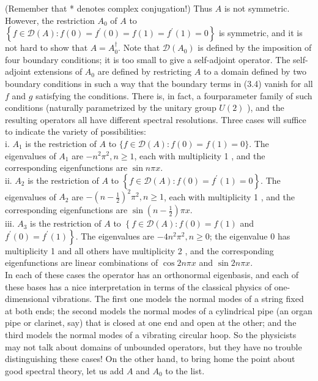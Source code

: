 \documentclass[10pt, letterpaper]{article}
\begin{document}
(Remember that * denotes complex conjugation!) Thus $A$ is not symmetric. However, the restriction $A_{0}$ of $A$ to $\left\{f \in \mathcal{D}(A): f(0)=f^{\prime}(0)=f(1)=f^{\prime}(1)=0\right\}$ is symmetric, and it is not hard to show that $A=A_{0}^{\dagger}$. Note that $\mathcal{D}\left(A_{0}\right)$ is defined by the imposition of four boundary conditions; it is too small to give a self-adjoint operator. The self-adjoint extensions of $A_{0}$ are defined by restricting $A$ to a domain defined by two boundary conditions in such a way that the boundary terms in (3.4) vanish for all $f$ and $g$ satisfying the conditions. There is, in fact, a fourparameter family of such conditions (naturally parametrized by the unitary group $U(2)$ ), and the resulting operators all have different spectral resolutions. Three cases will suffice to indicate the variety of possibilities:\\
i. $A_{1}$ is the restriction of $A$ to $\{f \in \mathcal{D}(A): f(0)=f(1)=0\}$. The eigenvalues of $A_{1}$ are $-n^{2} \pi^{2}, n \geq 1$, each with multiplicity 1 , and the corresponding eigenfunctions are $\sin n \pi x$.\\
ii. $A_{2}$ is the restriction of $A$ to $\left\{f \in \mathcal{D}(A): f(0)=f^{\prime}(1)=0\right\}$. The eigenvalues of $A_{2}$ are $-\left(n-\frac{1}{2}\right)^{2} \pi^{2}, n \geq 1$, each with multiplicity 1 , and the corresponding eigenfunctions are $\sin \left(n-\frac{1}{2}\right) \pi x$.\\
iii. $A_{3}$ is the restriction of $A$ to $\left\{f \in \mathcal{D}(A): f(0)=f(1)\right.$ and $\left.f^{\prime}(0)=f^{\prime}(1)\right\}$. The eigenvalues are $-4 n^{2} \pi^{2}, n \geq 0$; the eigenvalue 0 has multiplicity 1 and all others have multiplicity 2 , and the corresponding eigenfunctions are linear combinations of $\cos 2 n \pi x$ and $\sin 2 n \pi x$.\\
In each of these cases the operator has an orthonormal eigenbasis, and each of these bases has a nice interpretation in terms of the classical physics of one-dimensional vibrations. The first one models the normal modes of a string fixed at both ends; the second models the normal modes of a cylindrical pipe (an organ pipe or clarinet, say) that is closed at one end and open at the other; and the third models the normal modes of a vibrating circular hoop. So the physicists may not talk about domains of unbounded operators, but they have no trouble distinguishing these cases! On the other hand, to bring home the point about good spectral theory, let us add $A$ and $A_{0}$ to the list.\\
\end{document}
